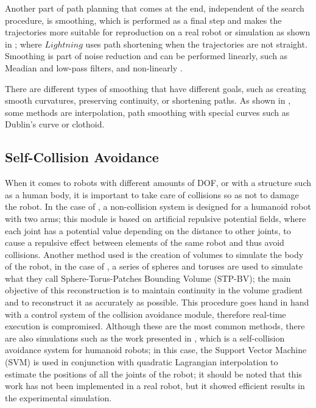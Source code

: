 \documentclass[thesis]{mas_proposal}
\begin{document}
		Another part of path planning that comes at the end, independent of the search procedure, is smoothing, which is performed as a final step and makes the trajectories more suitable for reproduction on a real robot or simulation as shown in \cite{Berenson2012, Coleman2015}; where $Lightning$ uses path shortening when the trajectories are not straight. Smoothing is part of noise reduction and can be performed linearly, such as Meadian and low-pass filters, and non-linearly \cite{Siegwart2011, Ravichandar2020, Si2021}.
	
		There are different types of smoothing that have different goals, such as creating smooth curvatures, preserving continuity, or shortening paths. As shown in \cite{Ravankar2018}, some methods are interpolation, path smoothing with special curves such as Dublin's curve or clothoid.
	
	\subsection{Self-Collision Avoidance}

		When it comes to robots with different amounts of DOF, or with a structure such as a human body, it is important to take care of collisions so as not to damage the robot. In the case of \cite{Dietrich2012, Santis2007}, a non-collision system is designed for a humanoid robot with two arms; this module is based on artificial repulsive potential fields, where each joint has a potential value depending on the distance to other joints, to cause a repulsive effect between elements of the same robot and thus avoid collisions. Another method used is the creation of volumes to simulate the body of the robot, in the case of \cite{Stasse2008}, a series of spheres and toruses are used to simulate what they call Sphere-Torus-Patches Bounding Volume (STP-BV); the main objective of this reconstruction is to maintain continuity in the volume gradient and to reconstruct it as accurately as possible. This procedure goes hand in hand with a control system of the collision avoidance module, therefore real-time execution is compromised. Although these are the most common methods, there are also simulations such as the work presented in \cite{Fang2015}, which is a self-collision avoidance system for humanoid robots; in this case, the Support Vector Machine (SVM) is used in conjunction with quadratic Lagrangian interpolation to estimate the positions of all the joints of the robot; it should be noted that this work has not been implemented in a real robot, but it showed efficient results in the experimental simulation.
\end{document}
